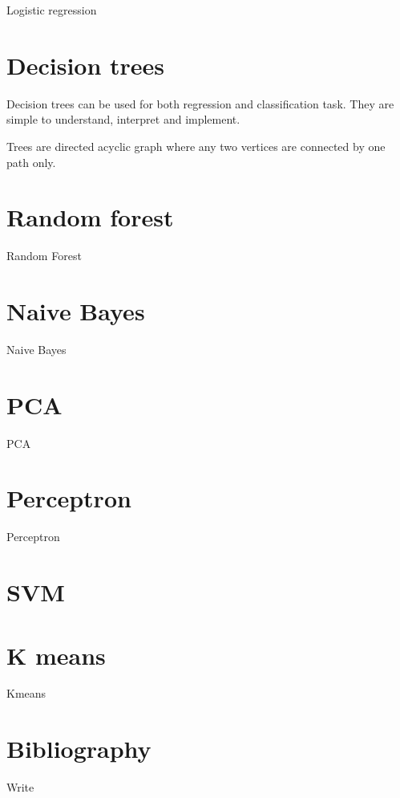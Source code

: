 \documentclass[10pt,a4paper]{book}
\begin{document}
    Logistic regression
    
\chapter{Decision trees}
    
    Decision trees can be used for both regression and classification task. 
    They are simple to understand, interpret and implement.
    
    Trees are directed acyclic graph where any two vertices are connected by one path only.
    
\chapter{Random forest}
    
    Random Forest
    
\chapter{Naive Bayes}
    
    Naive Bayes
    
\chapter{PCA}
    
    PCA
    
\chapter{Perceptron}
    
    Perceptron
    
\chapter{SVM}
    
\chapter{K means}
    
    Kmeans
    
\chapter{Bibliography}
    Write
    
\end{document}
